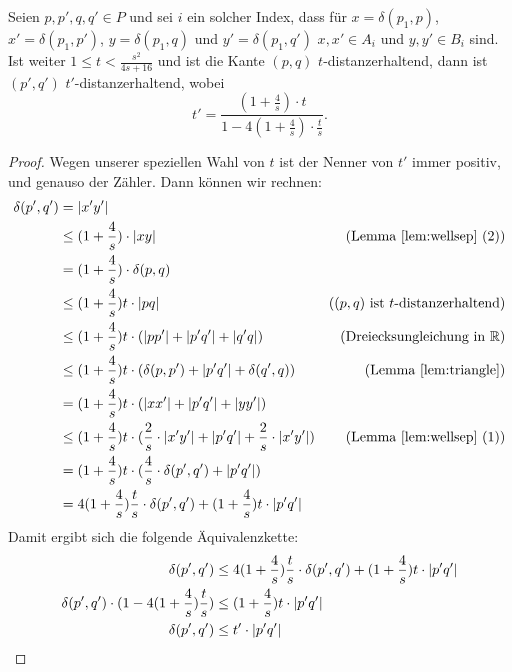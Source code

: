     \begin{lemma}
    	\label{lem:stranget}
    	Seien $p, p', q, q' \in P$ und sei $i$ ein solcher Index, dass für $x = \delta(p_1, p)$, $x' = \delta(p_1, p')$, $y = \delta(p_1, q)$ und $y' = \delta(p_1, q')$ $x, x' \in A_i$ und $y, y' \in B_i$ sind. 
    	Ist weiter $1 \leq t < \frac{s^2}{4s + 16}$ und ist die Kante $(p, q)$ $t$-distanzerhaltend, dann ist $(p', q')$ $t'$-distanzerhaltend, wobei
    	\[
    	t' = \frac{(1+\frac{4}{s})\cdot t}{1 - 4(1 + \frac{4}{s})\cdot\frac{t}{s}}.
    	\]
    \end{lemma}
    \begin{proof}
    	Wegen unserer speziellen Wahl von $t$ ist der Nenner von $t'$ immer positiv, und genauso der Zähler. Dann können wir rechnen:
    	\begin{align*}
	    	\delta(p', q') &= |x'y'| 
	    	\\ &\leq (1 + \frac{4}{s})\cdot|xy| & \text{(Lemma \ref{lem:wellsep} (2))}
	    	\\ &= (1 + \frac{4}{s})\cdot\delta(p, q)
	    	\\ &\leq (1 + \frac{4}{s})t\cdot |pq| & \text{($(p,q)$ ist $t$-distanzerhaltend)}
	    	\\ &\leq (1 + \frac{4}{s})t\cdot (|pp'| + |p'q'| + |q'q|) & \text{(Dreiecksungleichung in $\mathbb{R}$)}
	    	\\ &\leq (1 + \frac{4}{s})t\cdot (\delta(p,p') + |p'q'| + \delta(q', q)) & \text{(Lemma \ref{lem:triangle})}
	    	\\ &= (1 + \frac{4}{s})t\cdot (|xx'| + |p'q'| + |yy'|)
	    	\\ &\leq (1 + \frac{4}{s})t\cdot (\frac{2}{s}\cdot|x'y'| + |p'q'| + \frac{2}{s}\cdot|x'y'|) & \text{(Lemma \ref{lem:wellsep} (1))}
	    	\\ &= (1 + \frac{4}{s})t\cdot (\frac{4}{s}\cdot\delta(p',q') + |p'q'|)
	    	\\ &= 4(1 + \frac{4}{s})\frac{t}{s}\cdot \delta(p',q') + (1 + \frac{4}{s})t\cdot|p'q'|
    	\end{align*}
    	Damit ergibt sich die folgende Äquivalenzkette:
    	\begin{align*}
	    	\delta(p', q') &\leq 4(1 + \frac{4}{s})\frac{t}{s}\cdot \delta(p',q') + (1 + \frac{4}{s})t\cdot|p'q'|
	    	\\ \delta(p', q') \cdot (1 - 4(1 + \frac{4}{s})\frac{t}{s}) &\leq (1 + \frac{4}{s})t\cdot|p'q'| \tag*{\llap{\makebox[\linewidth][l]{$\Leftrightarrow$}}}
	    	\\ \delta(p',q') &\leq t' \cdot |p'q'| \tag*{\llap{\makebox[\linewidth][l]{$\Leftrightarrow$}}}
    	\end{align*}
    \end{proof}
    
